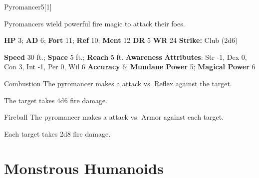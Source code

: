   \begin{monsection}{Pyromancer}{5}[1]
    \vspace{-1em}\vspace{-1em}
    \vspace{0em}

    
      Pyromancers wield powerful fire magic to attack their foes.
    

    \begin{spellcontent}
      \begin{spelltargetinginfo}
        \pari \textbf{HP} 3;
          \textbf{AD} 6;
          \textbf{Fort} 11;
          \textbf{Ref} 10;
          \textbf{Ment} 12
        \pari \textbf{DR} 5
        \pari \textbf{WR} 24
        \pari \textbf{Strike:}
            Club  (2d6)
      \end{spelltargetinginfo}
    \end{spellcontent}
    \begin{monsterfooter}
      \pari \textbf{Speed} 30 ft.;
        \textbf{Space} 5 ft.;
        \textbf{Reach} 5 ft.
      \pari \textbf{Awareness} 
      \pari \textbf{Attributes}:
        Str -1, Dex 0,
        Con 3, Int -1,
        Per 0, Wil 6
      \pari \textbf{Accuracy} 6;
        \textbf{Mundane Power} 5;
      \textbf{Magical Power} 6
    \end{monsterfooter}
  \end{monsection}
  \begin{freeability}{Combustion}
       The pyromancer makes a  attack
        vs. Reflex against the target.
    
    \hit The target takes 4d6 fire damage.
    \end{freeability}
  

    \begin{freeability}{Fireball}
       The pyromancer makes a  attack
        vs. Armor against each target.
    
    \hit Each target takes 2d8 fire damage.
    \end{freeability}
  
        \section{Monstrous Humanoids}
      
